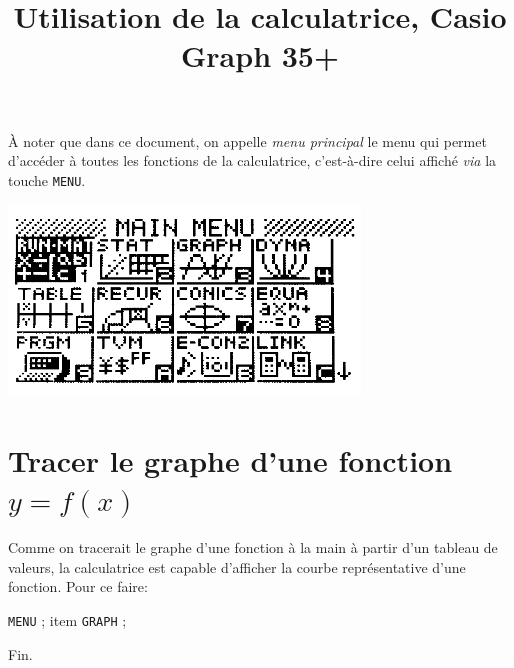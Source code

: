 \documentclass[a4paper,12pt]{scrartcl}
\date{}
\title{Utilisation de la calculatrice, Casio Graph 35+}
\author{}
\begin{document}
\maketitle

À noter que dans ce document, on appelle \emph{menu principal} le menu qui permet d'accéder à toutes les fonctions de la calculatrice, c'est-à-dire celui affiché \emph{via} la touche \texttt{MENU}.

\begin{center}
\includegraphics[width=0.7\textwidth]{pics/screen_menuPrincipal.png}
\end{center}

\section{Tracer le graphe d'une fonction $y = f(x)$}

Comme on tracerait le graphe d'une fonction à la main à partir d'un tableau de valeurs, la calculatrice est capable d'afficher la courbe représentative d'une fonction. Pour ce faire:

\texttt{MENU} ; item \texttt{GRAPH} ; 






\trait

\begin{center}
Fin.
\end{center}
\end{document}
